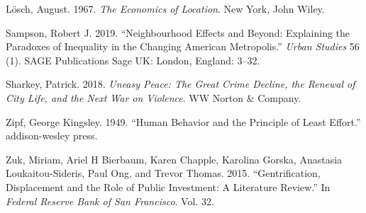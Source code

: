 \documentclass[12pt,]{article}
\begin{document}
\leavevmode\hypertarget{ref-losch1967economics}{}%
Lösch, August. 1967. \emph{The Economics of Location}. New York, John
Wiley.

\leavevmode\hypertarget{ref-sampson2019neighbourhood}{}%
Sampson, Robert J. 2019. ``Neighbourhood Effects and Beyond: Explaining
the Paradoxes of Inequality in the Changing American Metropolis.''
\emph{Urban Studies} 56 (1). SAGE Publications Sage UK: London, England:
3--32.

\leavevmode\hypertarget{ref-sharkey2018uneasy}{}%
Sharkey, Patrick. 2018. \emph{Uneasy Peace: The Great Crime Decline, the
Renewal of City Life, and the Next War on Violence}. WW Norton \&
Company.

\leavevmode\hypertarget{ref-zipf1949human}{}%
Zipf, George Kingsley. 1949. ``Human Behavior and the Principle of Least
Effort.'' addison-wesley press.

\leavevmode\hypertarget{ref-zuk2015gentrification}{}%
Zuk, Miriam, Ariel H Bierbaum, Karen Chapple, Karolina Gorska, Anastasia
Loukaitou-Sideris, Paul Ong, and Trevor Thomas. 2015. ``Gentrification,
Displacement and the Role of Public Investment: A Literature Review.''
In \emph{Federal Reserve Bank of San Francisco}. Vol. 32.
\end{document}
